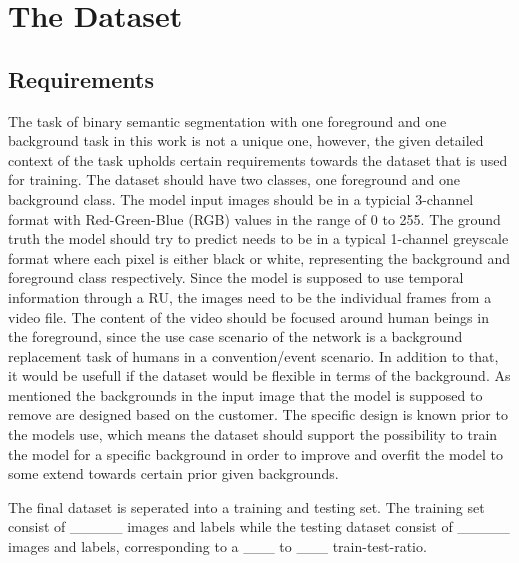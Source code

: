 \documentclass[11pt,
  paper=a4, 
  bibliography=totocnumbered,
	captions=tableheading,
	BCOR=10mm
]{scrreprt}
\theoremstyle{definition}
\begin{document}
\section{The Dataset}
\subsection{Requirements}\label{sec:Requirements}
The task of binary semantic segmentation with one foreground and one background task in this work is not a unique one, however, the given detailed context of the task upholds certain requirements towards the dataset that is used for training.
The dataset should have two classes, one foreground and one background class.
The model input images should be in a typicial 3-channel format with Red-Green-Blue (RGB) values in the range of 0 to 255. 
The ground truth the model should try to predict needs to be in a typical 1-channel greyscale format where each pixel is either black or white, representing the background and foreground class respectively.
Since the model is supposed to use temporal information through a RU, the images need to be the individual frames from a video file.
The content of the video should be focused around human beings in the foreground, since the use case scenario of the network is a background replacement task of humans in a convention/event scenario.
In addition to that, it would be usefull if the dataset would be flexible in terms of the background.
As mentioned the backgrounds in the input image that the model is supposed to remove are designed based on the customer.
The specific design is known prior to the models use, which means the dataset should support the possibility to train the model for a specific background in order to improve and overfit the model to some extend towards certain prior given backgrounds.

The final dataset is seperated into a training and testing set.
The training set consist of _____ images and labels while the testing dataset consist of _____ images and labels, corresponding to a ___ to ___ train-test-ratio.
\end{document}
